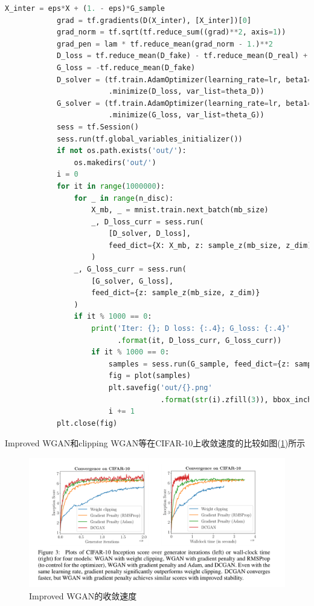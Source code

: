 \begin{lstlisting}[language = Python]
            X_inter = eps*X + (1. - eps)*G_sample
            grad = tf.gradients(D(X_inter), [X_inter])[0]
            grad_norm = tf.sqrt(tf.reduce_sum((grad)**2, axis=1))
            grad_pen = lam * tf.reduce_mean(grad_norm - 1.)**2
            D_loss = tf.reduce_mean(D_fake) - tf.reduce_mean(D_real) + grad_pen
            G_loss = -tf.reduce_mean(D_fake)
            D_solver = (tf.train.AdamOptimizer(learning_rate=lr, beta1=0.5)
                        .minimize(D_loss, var_list=theta_D))
            G_solver = (tf.train.AdamOptimizer(learning_rate=lr, beta1=0.5)
                        .minimize(G_loss, var_list=theta_G))
            sess = tf.Session()
            sess.run(tf.global_variables_initializer())
            if not os.path.exists('out/'):
                os.makedirs('out/')
            i = 0
            for it in range(1000000):
                for _ in range(n_disc):
                    X_mb, _ = mnist.train.next_batch(mb_size)
                    _, D_loss_curr = sess.run(
                        [D_solver, D_loss],
                        feed_dict={X: X_mb, z: sample_z(mb_size, z_dim)}
                    )
                _, G_loss_curr = sess.run(
                    [G_solver, G_loss],
                    feed_dict={z: sample_z(mb_size, z_dim)}
                )
                if it % 1000 == 0:
                    print('Iter: {}; D loss: {:.4}; G_loss: {:.4}'
                          .format(it, D_loss_curr, G_loss_curr))
                    if it % 1000 == 0:
                        samples = sess.run(G_sample, feed_dict={z: sample_z(16, z_dim)})
                        fig = plot(samples)
                        plt.savefig('out/{}.png'
                                    .format(str(i).zfill(3)), bbox_inches='tight')
                        i += 1
            plt.close(fig)
            \end{lstlisting}
            \par
            Improved WGAN和clipping WGAN等在CIFAR-10上收敛速度的比较如图(\ref{fig:Improved WGAN的收敛速度})所示
                \begin{figure}[H]
                \centering
                \includegraphics[width=12cm]{images/Improved_WGAN.jpg}
                \caption{Improved WGAN的收敛速度}
                \label{fig:Improved WGAN的收敛速度}
                \end{figure}

